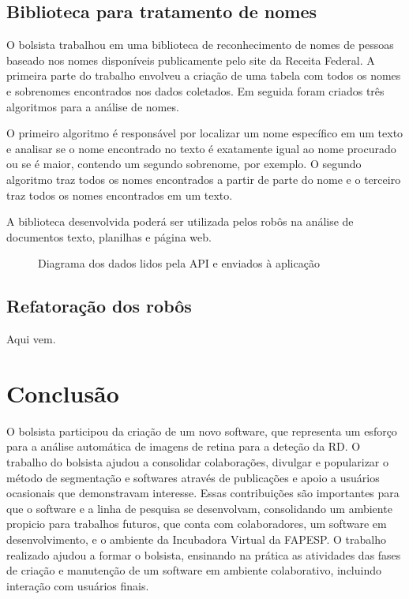 \documentclass[12pt]{report}
\begin{document}
\section{Biblioteca para tratamento de nomes}
O bolsista trabalhou em uma biblioteca de reconhecimento de nomes de pessoas baseado nos nomes disponíveis publicamente pelo site da Receita Federal. A primeira parte do trabalho envolveu a criação de uma tabela com todos os nomes e sobrenomes encontrados nos dados coletados. Em seguida foram criados três algoritmos para a análise de nomes.

O primeiro algoritmo é responsável por localizar um nome específico em um texto e analisar se o nome encontrado no texto é exatamente igual ao nome procurado ou se é maior, contendo um segundo sobrenome, por exemplo. O segundo algoritmo traz todos os nomes encontrados a partir de parte do nome e o terceiro traz todos os nomes encontrados em um texto.

A biblioteca desenvolvida poderá ser utilizada pelos robôs na análise de documentos texto, planilhas e página web.

\begin{figure}[h!]
\centering
{}
\caption{Diagrama dos dados lidos pela API e enviados à aplicação}
\label{fig:biblioteca}
\end{figure}

\section{Refatoração dos robôs}
Aqui vem.

\chapter{Conclusão}
\label{chp:conclusao}
O bolsista participou da criação de um novo software, que representa um esforço para a análise
automática de imagens de retina para a deteção da RD. O trabalho do bolsista ajudou a consolidar
colaborações, divulgar e popularizar o método de segmentação e softwares através de publicações
e apoio a usuários ocasionais que demonstravam interesse. Essas contribuições são importantes
para que o software e a linha de pesquisa se desenvolvam, consolidando um ambiente propicio para
trabalhos futuros, que conta com colaboradores, um software em desenvolvimento, e o ambiente
da Incubadora Virtual da FAPESP.  O trabalho realizado ajudou a formar o bolsista, ensinando na
prática as atividades das fases de criação e manutenção de um software em ambiente colaborativo,
incluindo interação com usuários finais.
\end{document}
